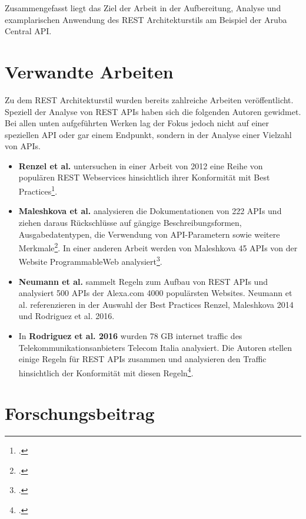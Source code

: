 Zusammengefasst liegt das Ziel der Arbeit in der Aufbereitung, Analyse und examplarischen Anwendung des REST Architekturstils am Beispiel der Aruba Central API.

\section{Verwandte Arbeiten}\label{section:verwandte-arbeiten}

Zu dem REST Architekturstil wurden bereits zahlreiche Arbeiten veröffentlicht. Speziell der Analyse von REST APIs haben sich die folgenden Autoren gewidmet. Bei allen unten aufgeführten Werken lag der Fokus jedoch nicht auf einer speziellen API oder gar einem Endpunkt, sondern in der Analyse einer Vielzahl von APIs.

\begin{itemize}
    \item \textbf{Renzel et al.} untersuchen in einer Arbeit von 2012 eine Reihe von populären REST Webservices hinsichtlich ihrer Konformität mit Best Practices\footcite[Vgl. ][]{hutchison_todays_2012}.

    \item \textbf{Maleshkova et al.} analysieren die Dokumentationen von 222 APIs und ziehen daraus Rückschlüsse auf gängige Beschreibungsformen, Ausgabedatentypen, die Verwendung von API-Parametern sowie weitere Merkmale\footcite[Vgl. ][]{maleshkova_investigating_2010}. In einer anderen Arbeit werden von Maleshkova 45 APIs von der Website ProgrammableWeb analysiert\footcite[Vgl. ][]{presutti_restful_2014}. 

    \item \textbf{Neumann et al.} sammelt Regeln zum Aufbau von REST APIs und analysiert 500 APIs der Alexa.com 4000 populärsten Websites. Neumann et al. referenzieren in der Auswahl der Best Practices Renzel, Maleshkova 2014 und Rodriguez et al. 2016.

    \item In \textbf{Rodriguez et al. 2016} wurden 78 GB internet traffic des Telekommunikationsanbieters Telecom Italia analysiert. Die Autoren stellen einige Regeln für REST APIs zusammen und analysieren den Traffic hinsichtlich der Konformität mit diesen Regeln\footcite[Vgl. ][]{rodriguez_rest_2016}. 

\end{itemize}

\section{Forschungsbeitrag}\label{section:forschungsbeitrag}

